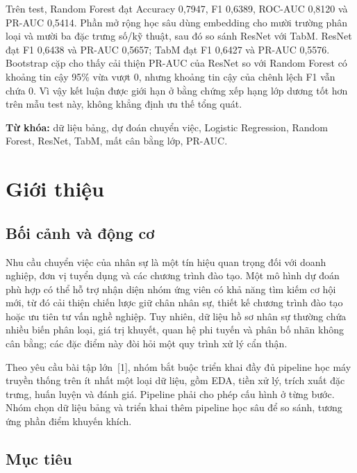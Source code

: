 \documentclass[12pt,a4paper,oneside]{report}
\begin{document}
Trên test, Random Forest đạt Accuracy 0,7947, F1 0,6389, ROC-AUC 0,8120 và PR-AUC 0,5414. Phần mở rộng học sâu dùng embedding cho mười trường phân loại và mười ba đặc trưng số/kỹ thuật, sau đó so sánh ResNet với TabM. ResNet đạt F1 0,6438 và PR-AUC 0,5657; TabM đạt F1 0,6427 và PR-AUC 0,5576. Bootstrap cặp cho thấy cải thiện PR-AUC của ResNet so với Random Forest có khoảng tin cậy 95\% vừa vượt 0, nhưng khoảng tin cậy của chênh lệch F1 vẫn chứa 0. Vì vậy kết luận được giới hạn ở bằng chứng xếp hạng lớp dương tốt hơn trên mẫu test này, không khẳng định ưu thế tổng quát.

\noindent\textbf{Từ khóa:} dữ liệu bảng, dự đoán chuyển việc, Logistic Regression, Random Forest, ResNet, TabM, mất cân bằng lớp, PR-AUC.

\tableofcontents
\listoffigures
\listoftables
\clearpage
{}

\chapter{Giới thiệu}

\section{Bối cảnh và động cơ}

Nhu cầu chuyển việc của nhân sự là một tín hiệu quan trọng đối với doanh nghiệp, đơn vị tuyển dụng và các chương trình đào tạo. Một mô hình dự đoán phù hợp có thể hỗ trợ nhận diện nhóm ứng viên có khả năng tìm kiếm cơ hội mới, từ đó cải thiện chiến lược giữ chân nhân sự, thiết kế chương trình đào tạo hoặc ưu tiên tư vấn nghề nghiệp. Tuy nhiên, dữ liệu hồ sơ nhân sự thường chứa nhiều biến phân loại, giá trị khuyết, quan hệ phi tuyến và phân bố nhãn không cân bằng; các đặc điểm này đòi hỏi một quy trình xử lý cẩn thận.

Theo yêu cầu bài tập lớn~[1], nhóm bắt buộc triển khai đầy đủ pipeline học máy truyền thống trên ít nhất một loại dữ liệu, gồm EDA, tiền xử lý, trích xuất đặc trưng, huấn luyện và đánh giá. Pipeline phải cho phép cấu hình ở từng bước. Nhóm chọn dữ liệu bảng và triển khai thêm pipeline học sâu để so sánh, tương ứng phần điểm khuyến khích.

\section{Mục tiêu}
\end{document}
